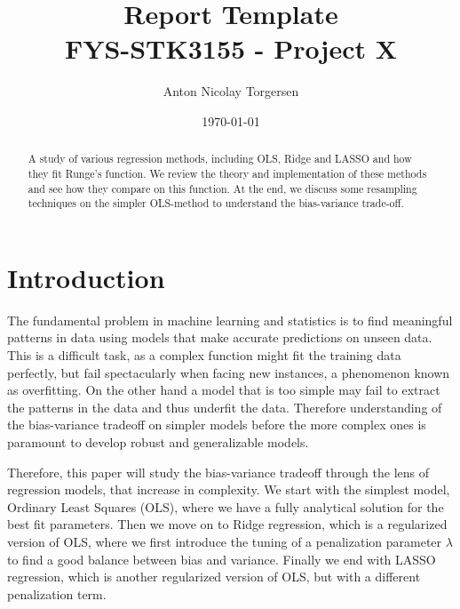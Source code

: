 \documentclass[amssymb,twocolumn,aps]{revtex4}
\begin{document}
\title{Report Template \\
    \normalsize FYS-STK3155 - Project X}
\date{\today}               
\author{
    Anton Nicolay Torgersen 
}


\newpage
    \begin{abstract}
A study of various regression methods, including OLS, Ridge and LASSO and how they fit Runge's function. 
We review the theory and implementation of these methods and see how they compare on this function.
At the end, we discuss some resampling techniques on the simpler OLS-method to understand the bias-variance trade-off.
\end{abstract}


    \maketitle
    \thispagestyle{empty} %

    



\section{Introduction}

The fundamental problem in machine learning and statistics is to find meaningful patterns in data using models that make accurate predictions on unseen data.
This is a difficult task, as a complex function might fit the training data perfectly, but fail spectacularly when facing new instances, a phenomenon known as overfitting.
On the other hand a model that is too simple may fail to extract the patterns in the data and thus underfit the data.
Therefore understanding of the bias-variance tradeoff on simpler models before the more complex ones is paramount to develop robust and generalizable models.

Therefore, this paper will study the bias-variance tradeoff through the lens of regression models, that increase in complexity.
We start with the simplest model, Ordinary Least Squares (OLS), where we have a fully analytical solution for the best fit parameters.
Then we move on to Ridge regression, which is a regularized version of OLS, where we first introduce the tuning of a penalization parameter $\lambda$ to find a good balance between bias and variance.
Finally we end with LASSO regression, which is another regularized version of OLS, but with a different penalization term.
\end{document}
